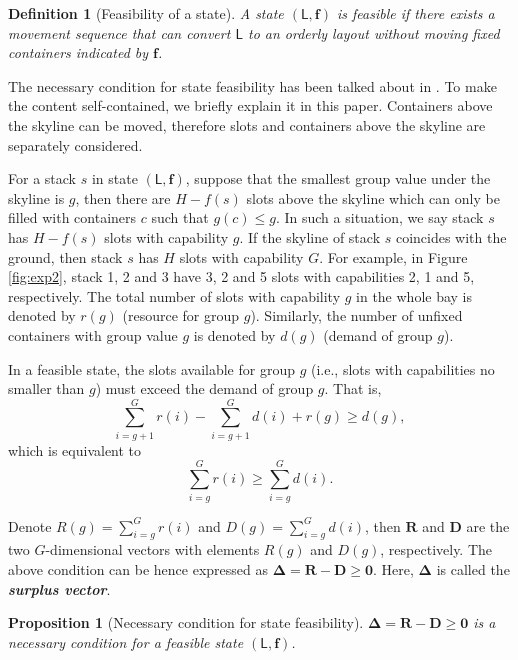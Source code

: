 \documentclass[review,3p,times,12pt,number]{elsarticle}\usepackage{amsmath}\usepackage{amssymb}
\newtheorem{proposition}{Proposition}
\newtheorem{definition}{Definition}
\renewcommand{\citet}[1]{\citeauthor{#1} \citep{#1}}
\renewcommand{\emph}[1]{\textbf{\textit{#1}}}
\begin{document}
\begin{definition}[Feasibility of a state]
A state $(\mathsf{L},\boldsymbol{f})$ is feasible if there exists a movement sequence that can convert $\mathsf{L}$ to an orderly layout without moving fixed containers indicated by $\boldsymbol{f}$.
\end{definition}

The necessary condition for state feasibility has been talked about in \citet{wang2014}. To make the content self-contained, we briefly explain it in this paper. Containers above the skyline can be moved, therefore slots and containers above the skyline are separately considered.

For a stack $s$ in state $(\mathsf{L},\boldsymbol{f})$, suppose that the smallest group value under the skyline is $g$, then there are $H-f(s)$ slots above the skyline which can only be filled with containers $c$ such that $g(c)\le g$. In such a situation, we say stack $s$ has $H-f(s)$ slots with capability $g$.
If the skyline of stack $s$ coincides with the ground, then stack $s$ has $H$ slots with capability $G$.
For example, in Figure \ref{fig:exp2}, stack 1, 2 and 3 have 3, 2 and 5 slots with capabilities 2, 1 and 5, respectively. The total number of slots with capability $g$ in the whole bay is denoted by $r(g)$ (resource for group $g$).
Similarly, the number of unfixed containers with group value $g$ is denoted by $d(g)$ (demand of group $g$).

In a feasible state, the slots available for group $g$ (i.e., slots with capabilities no smaller than $g$) must exceed the demand of group $g$. That is,
\begin{equation*}
\sum^G_{i=g+1}r(i)-\sum^G_{i=g+1}d(i)+r(g)\ge d(g),
\end{equation*}
which is equivalent to
\begin{equation*}
\sum^G_{i=g}r(i)\ge \sum^G_{i=g} d(i).
\end{equation*}

Denote $R(g)=\sum^G_{i=g}r(i)$ and $D(g)=\sum^G_{i=g}d(i)$, then $\boldsymbol R$ and $\boldsymbol D$ are the two $G$-dimensional vectors with elements $R(g)$ and $D(g)$, respectively. The above condition can be hence expressed as $\boldsymbol{\Delta}=\boldsymbol{R}-\boldsymbol{D}\ge \boldsymbol{0}$. Here, $\boldsymbol \Delta$ is called the \emph{surplus vector}.



\begin{proposition}[Necessary condition for state feasibility]
$\boldsymbol{\Delta}=\boldsymbol{R}-\boldsymbol{D}\ge \boldsymbol{0}$ is a necessary condition for a feasible state $(\mathsf{L},\boldsymbol{f})$.
\end{proposition}
\end{document}
